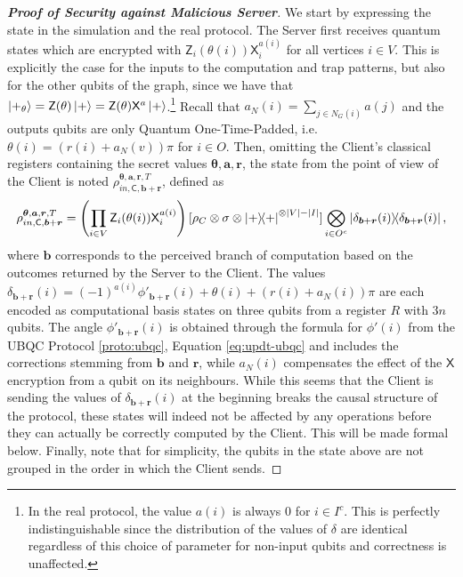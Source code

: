 \documentclass[12pt]{iopart}
\newcommand{\cptp}[1]{\mathsf{#1}} \newcommand{\pd}[1]{\mathcal{#1}}  \newcommand{\sch}[1]{\bm{#1}}
\newcommand{\X}{\cptp{X}}
\newcommand{\Z}{\cptp{Z}}
\renewcommand{\1}{\mathds{1}}
\begin{document}
\begin{proof}[\bf Proof of Security against Malicious Server]
We start by expressing the state in the simulation and the real protocol. The Server first receives quantum states which are encrypted with $\Z_i(\theta(i))\X_i^{a(i)}$ for all vertices $i \in V$. This is explicitly the case for the inputs to the computation and trap patterns, but also for the other qubits of the graph, since we have that $\ket{+_\theta} = \Z(\theta)\ket{+} = \Z(\theta)\X^a\ket{+}$.\footnote{In the real protocol, the value $a(i)$ is always $0$ for $i \in I^c$. This is perfectly indistinguishable since the distribution of the values of $\delta$ are identical regardless of this choice of parameter for non-input qubits and correctness is unaffected.} Recall that $a_N(i) = \sum_{j \in N_G(i)} a(j)$ and the outputs qubits are only Quantum One-Time-Padded, i.e.~$\theta(i) = (r(i) + a_N(v)) \pi$ for $i \in O$. Then, omitting the Client's classical registers containing the secret values $\bm{\theta},\bm{a}, \bm{r}$, the state from the point of view of the Client is noted $\rho_{in, \cptp C, \bm{b} + \bm{r}}^{\bm{\theta},\bm{a}, \bm{r}, T}$, defined as
\begin{align}
\rho_{in, \cptp C, \bm{b} + \bm{r}}^{\bm{\theta},\bm{a}, \bm{r}, T} = \left(\prod_{i \in V} \Z_i(\theta(i))\X^{a(i)}_i\right) [\rho_C \otimes \sigma \otimes \dyad{+}^{\otimes |V| - |I|}]\bigotimes_{i \in O^c} \dyad{\delta_{\bm{b} + \bm{r}}(i)},
\end{align}
where $\bm{b}$ corresponds to the perceived branch of computation based on the outcomes returned by the Server to the Client. The values $\delta_{\bm{b} + \bm{r}}(i) = (-1)^{a(i)}\phi'_{\bm{b} + \bm{r}}(i) + \theta(i) + (r(i) + a_N(i)) \pi$ are each encoded as computational basis states on three qubits from a register $R$ with $3n$ qubits. The angle $\phi'_{\bm{b} + \bm{r}}(i)$ is obtained through the formula for $\phi'(i)$ from the UBQC Protocol \ref{proto:ubqc}, Equation \ref{eq:updt-ubqc} and includes the corrections stemming from $\bm{b}$ and $\bm{r}$, while $a_N(i)$ compensates the effect of the $\X$ encryption from a qubit on its neighbours. While this seems that the Client is sending the values of $\delta_{\bm{b} + \bm{r}}(i)$ at the beginning breaks the causal structure of the protocol, these states will indeed not be affected by any operations before they can actually be correctly computed by the Client. This will be made formal below. Finally, note that for simplicity, the qubits in the state above are not grouped in the order in which the Client sends.


\end{proof}
\end{document}
